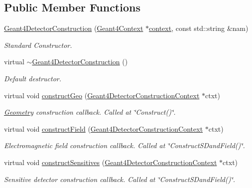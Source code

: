 \subsection*{Public Member Functions}
\begin{DoxyCompactItemize}
\item 
\hyperlink{class_d_d4hep_1_1_simulation_1_1_geant4_detector_construction_a82b863f888681245e472b87ead98c344}{Geant4\+Detector\+Construction} (\hyperlink{class_d_d4hep_1_1_simulation_1_1_geant4_context}{Geant4\+Context} $\ast$\hyperlink{class_d_d4hep_1_1_simulation_1_1_geant4_action_aa9d87f0ec2a72b7fc2591b18f98d75cf}{context}, const std\+::string \&nam)
\begin{DoxyCompactList}\small\item\em Standard Constructor. \end{DoxyCompactList}\item 
virtual \hyperlink{class_d_d4hep_1_1_simulation_1_1_geant4_detector_construction_a78fcc174794d8ef64b402c1c296c43db}{$\sim$\+Geant4\+Detector\+Construction} ()
\begin{DoxyCompactList}\small\item\em Default destructor. \end{DoxyCompactList}\item 
virtual void \hyperlink{class_d_d4hep_1_1_simulation_1_1_geant4_detector_construction_a91ab552e6ee76df9e0ebff3351863ebd}{construct\+Geo} (\hyperlink{class_d_d4hep_1_1_simulation_1_1_geant4_detector_construction_context}{Geant4\+Detector\+Construction\+Context} $\ast$ctxt)
\begin{DoxyCompactList}\small\item\em \hyperlink{namespace_d_d4hep_1_1_geometry}{Geometry} construction callback. Called at \char`\"{}\+Construct()\char`\"{}. \end{DoxyCompactList}\item 
virtual void \hyperlink{class_d_d4hep_1_1_simulation_1_1_geant4_detector_construction_af7b296f1aa62b4d836c6275108953208}{construct\+Field} (\hyperlink{class_d_d4hep_1_1_simulation_1_1_geant4_detector_construction_context}{Geant4\+Detector\+Construction\+Context} $\ast$ctxt)
\begin{DoxyCompactList}\small\item\em Electromagnetic field construction callback. Called at \char`\"{}\+Construct\+S\+Dand\+Field()\char`\"{}. \end{DoxyCompactList}\item 
virtual void \hyperlink{class_d_d4hep_1_1_simulation_1_1_geant4_detector_construction_a852a3cd581f106a1f8c65122fb517dab}{construct\+Sensitives} (\hyperlink{class_d_d4hep_1_1_simulation_1_1_geant4_detector_construction_context}{Geant4\+Detector\+Construction\+Context} $\ast$ctxt)
\begin{DoxyCompactList}\small\item\em Sensitive detector construction callback. Called at \char`\"{}\+Construct\+S\+Dand\+Field()\char`\"{}. \end{DoxyCompactList}\end{DoxyCompactItemize}
